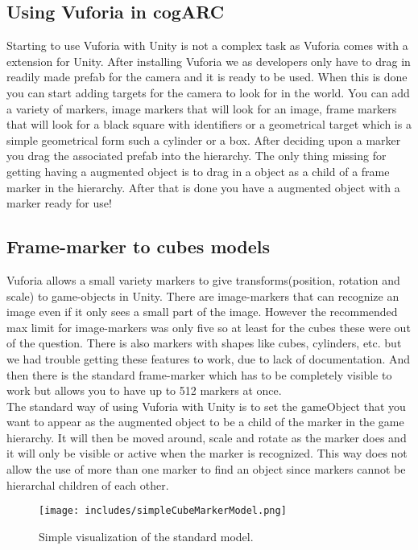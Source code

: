 \subsection{Using Vuforia in cogARC}
\label{subsec:usingVuforiaincogARC}
Starting to use Vuforia with Unity is not a complex task as Vuforia comes with a extension for Unity.
After installing Vuforia we as developers only have to drag in readily made \gls{prefab} for the camera and it is ready to be used.
When this is done you can start adding targets for the camera to look for in the world.
You can add a variety of markers, image markers that will look for an image, frame markers that will look for a black square with identifiers or a geometrical target which is a simple geometrical form such a cylinder or a box.
After deciding upon a marker you drag the associated prefab into the hierarchy.
The only thing missing for getting having a augmented object is to drag in a object as a child of a frame marker in the hierarchy.
After that is done you have a augmented object with a marker ready for use!

\subsection{Frame-marker to cubes models}
\label{subsec:framemarker_model} 
Vuforia allows a small variety markers to give transforms(position, rotation and scale) to game-objects in Unity. 
There are image-markers that can recognize an image even if it only sees a small part of the image. 
However the recommended max limit for image-markers was only five so at least for the cubes these were out of the question. 
There is also markers with shapes like cubes, cylinders, etc. but we had trouble getting these features to work, due to lack of documentation. 
And then there is the standard frame-marker which has to be completely visible to work but allows you to have up to 512 markers at once.\\
The standard way of using Vuforia with Unity is to set the gameObject that you want to appear as the augmented object to be a child of the marker in the game hierarchy. 
It will then be moved around, scale and rotate as the marker does and it will only be visible or active when the marker is recognized. 
This way does not allow the use of more than one marker to find an object since markers cannot be hierarchal children of each other. 

\begin{figure}[ht] 
        \capstart
        \centering  
        \texttt{[image: includes/simpleCubeMarkerModel.png]}    
        \caption[Standard Cube-Marker model]{Simple visualization of the standard model.} 
        \label{fig:simple_cube_marker_model} 
\end{figure}

